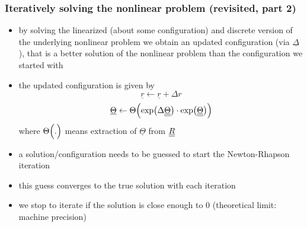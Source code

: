 \begin{frame}
  \frametitle{Iteratively solving the nonlinear problem (revisited, part 2)}

  \begin{itemize}
    \item by solving the linearized (about some configuration) and discrete version of the underlying nonlinear problem we obtain an updated configuration (via $\underline{\Delta}$), that is a better solution of the nonlinear problem than the configuration we started with
    \item the updated configuration is given by
      \begin{displaymath}
        \underline{r} \leftarrow \underline{r} + \Delta{r}
      \end{displaymath}
      \begin{displaymath}
        \underline{\Theta} \leftarrow \Theta \Bigl( \exp \bigl( \Delta \underline{\underline{\Theta}} \bigr) \cdot \exp \bigl( \underline{\underline{\Theta}} \bigr) \Bigr)
      \end{displaymath}
      where $\Theta \Bigl( . \Bigr)$ means extraction of $\underline{\Theta}$ from $\underline{\underline{R}}$
    \item a solution/configuration needs to be guessed to start the Newton-Rhapson iteration
    \item this guess converges to the true solution with each iteration
    \item we stop to iterate if the solution is close enough to $0$ \newline
      (theoretical limit: machine precision)
  \end{itemize}
  
  
\end{frame}


